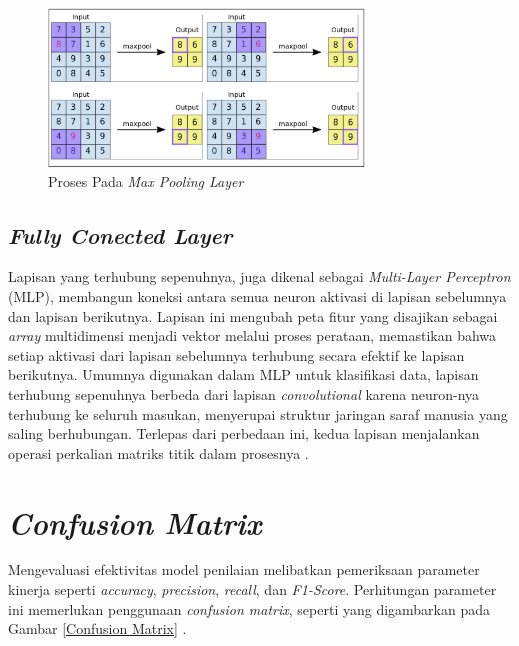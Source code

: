     \begin{figure}[H]
      \centering
      \includegraphics[width=0.75\textwidth]{figures/bab2/pool.png}
      \caption{Proses Pada \textit{Max Pooling Layer} \cite{fiki}}
      \label{Proses Pada Max Pooling Layer}

    
    \end{figure}


\subsection{\textit{Fully Conected Layer}}

    Lapisan yang terhubung sepenuhnya, juga dikenal sebagai \textit{Multi-Layer Perceptron} (MLP), membangun koneksi antara semua neuron aktivasi di lapisan sebelumnya dan lapisan berikutnya. Lapisan ini mengubah peta fitur yang disajikan sebagai \textit{array} multidimensi menjadi vektor melalui proses perataan, memastikan bahwa setiap aktivasi dari lapisan sebelumnya terhubung secara efektif ke lapisan berikutnya. Umumnya digunakan dalam MLP untuk klasifikasi data, lapisan terhubung sepenuhnya berbeda dari lapisan \textit{convolutional} karena neuron-nya terhubung ke seluruh masukan, menyerupai struktur jaringan saraf manusia yang saling berhubungan. Terlepas dari perbedaan ini, kedua lapisan menjalankan operasi perkalian matriks titik dalam prosesnya \cite{Dewi2018}.

    

\section{\textit{Confusion Matrix}}

    Mengevaluasi efektivitas model penilaian melibatkan pemeriksaan parameter kinerja seperti \textit{accuracy}, \textit{precision}, \textit{recall}, dan \textit{F1-Score}. Perhitungan parameter ini memerlukan penggunaan \textit{confusion matrix}, seperti yang digambarkan pada Gambar \ref{Confusion Matrix} \cite{Nurhikmat2018}.

